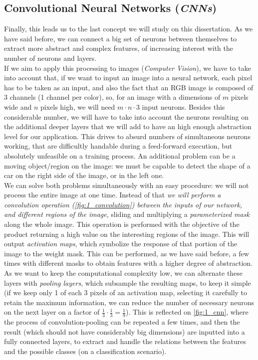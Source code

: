 \subsection{Convolutional Neural Networks (\emph{CNNs})}
\label{sec:1_cnn}

Finally, this leads us to the last concept we will study on this dissertation. As we have said before, we can connect a big set of neurons between themselves to extract more abstract and complex features, of increasing interest with the number of neurons and layers.\\
 
If we aim to apply this processing to images (\textit{Computer Vision}), we have to take into account that, if we want to input an image into a neural network, each pixel has to be taken as an input, and also the fact that an RGB image is composed of 3 channels (1 channel per color), so, for an image with a dimensions of $m$ pixels wide and $n$ pixels high, we will need $m\cdot n \cdot 3$ input neurons. Besides this considerable number, we will have to take into account the neurons resulting on the additional deeper layers that we will add to have an high enough abstraction level for our application. This drives to absurd numbers of simultaneous neurons working, that are difficultly handable during a feed-forward execution, but absolutely unfeasible on a training process. An additional problem can be a moving object/region on the image: we must be capable to detect the shape of a car on the right side of the image, or in the left one.\\

We can solve both problems simultaneously with an easy procedure: we will not process the entire image at one time. Instead of that \textit{we will perform a convolution operation (\autoref{fig:1_convolution}) between the inputs of our network, and different regions of the image}, sliding and multiplying a \emph{parameterized mask} along the whole image. This operation is performed with the objective of the product returning a high value on the interesting regions of the image. This will output \emph{activation maps}, which symbolize the response of that portion of the image to the weight mask. This can be performed, as we have said before, a few times with different masks to obtain features with a higher degree of abstraction. As we want to keep the computational complexity low, we can alternate these layers with \textit{pooling layers}, which subsample the resulting maps, to keep it simple (if we keep only 1 of each 3 pixels of an activation map, selecting it carefully to retain the maximum information, we can reduce the number of necessary neurons on the next layer on a factor of $\frac{1}{3} \cdot \frac{1}{3} = \frac{1}{9}$). This is reflected on \autoref{fig:1_cnn}, where the process of convolution-pooling can be repeated a few times, and then the result (which should not have considerably big dimensions) are inputted into a fully connected layers, to extract and handle the relations between the features and the possible classes (on a classification scenario).\\


